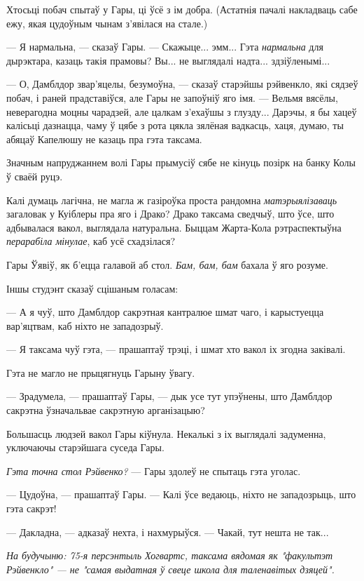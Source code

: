 Хтосьці побач спытаў у Гары, ці ўсё з ім добра. (Астатнія пачалі накладваць сабе ежу, якая
цудоўным чынам з'явілася на стале.)

--- Я нармальна, --- сказаў Гары. --- Скажыце... эмм... Гэта \emph{нармальна} для
дырэктара, казаць такія прамовы? Вы...  не выглядалі надта... здзіўленымі...

--- О, Дамблдор звар'яцелы, безумоўна, --- сказаў старэйшы рэйвенкло, які сядзеў побач,
і раней прадставіўся, але Гары не запоўніў яго імя. --- Вельмя вясёлы, неверагодна 
моцны чарадзей, але цалкам з'ехаўшы з глузду... Дарэчы, я бы хацеў калісьці дазнацца,
чаму ў цябе з рота цякла зялёная вадкасць, хаця, думаю, ты  абяцаў Капелюшу
не казаць пра гэта таксама.

Значным напруджаннем волі Гары прымусіў сябе не кінуць позірк на банку Колы ў
сваёй руцэ.

Калі думаць лагічна, не магла ж газіроўка проста рандомна  \emph{матэрыялізаваць}
загаловак у Куіблеры  пра яго і Драко? Драко таксама сведчыў, што ўсе, што адбывалася
вакол, выглядала натуральна. Быццам Жарта-Кола рэтраспектыўна 
\emph{перарабіла мінулае}, каб усё схадзілася?

Гары Ўявіў, як б'ецца галавой аб стол.  \emph{Бам, бам, бам} бахала ў яго розуме.

Іншы студэнт сказаў сцішаным голасам:

--- А я чуў, што Дамблдор сакрэтная кантралюе шмат чаго, і карыстуецца вар'яцтвам, каб 
ніхто не западозрыў.

--- Я таксама чуў гэта, --- прашаптаў трэці, і шмат хто вакол іх згодна заківалі.

Гэта не магло не прыцягнуць Гарыну ўвагу.

--- Зрадумела, --- прашаптаў Гары, --- дык усе тут упэўнены, што Дамблдор сакрэтна 
ўзначальвае сакрэтную арганізацыю?

Большасць людзей вакол Гары кіўнула. Некалькі з іх выглядалі задуменна, уключаючы
старэйшага суседа Гары.

\emph{Гэта точна стол Рэйвенко?} --- Гары здолеў не спытаць гэта уголас.

--- Цудоўна, --- прашаптаў Гары. --- Калі ўсе ведаюць, ніхто не западозрыць, што 
гэта сакрэт!

--- Дакладна, --- адказаў нехта, і нахмурыўся. --- Чакай, тут нешта не так...

\emph{На будучыню: 75-я персэнтыль Хогвартс, таксама вядомая як "факультэт Рэйвенкло"
--- не "самая выдатная ў свеце школа для таленавітых дзяцей".}

